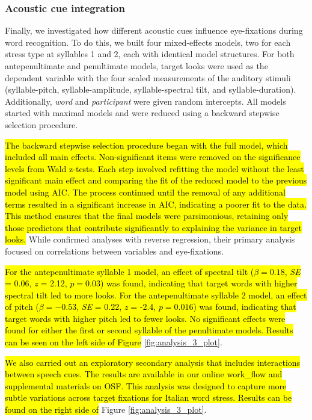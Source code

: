 \subsubsection{Acoustic cue integration}

Finally, we investigated how different acoustic cues influence eye-fixations during word recognition. To do this, we built four mixed-effects models, two for each stress type at syllables 1 and 2, each with identical model structures. For both antepenultimate and penultimate models, target looks were used as the dependent variable with the four scaled measurements of the auditory stimuli (syllable-pitch, syllable-amplitude, syllable-spectral tilt, and syllable-duration). Additionally, \textit{word} and \textit{participant} were given random intercepts. All models started with maximal models and were reduced using a backward stepwise selection procedure. 

\hl{The backward stepwise selection procedure began with the full model, which included all main effects. Non-significant items were removed on the significance levels from Wald z-tests. Each step involved refitting the model without the least significant main effect and comparing the fit of the reduced model to the previous model using AIC. The process continued until the removal of any additional terms resulted in a significant increase in AIC, indicating a poorer fit to the data. This method ensures that the final models were parsimonious, retaining only those predictors that contribute significantly to explaining the variance in target looks.} While \cite{Sulpizio_McQueen_2012} confirmed analyses with reverse regression, their primary analysis focused on correlations between variables and eye-fixations. 

\hl{For the antepenultimate syllable 1 model, an effect of spectral tilt ($\beta= 0.18$, \textit{SE} = 0.06, \textit{z} = 2.12, $p = 0.03$) was found, indicating that target words with higher spectral tilt led to more looks. For the antepenultimate syllable 2 model, an effect of pitch ($\beta= -0.53$, \textit{SE} = 0.22, \textit{z} = -2.4, $p = 0.016$) was found, indicating that target words with higher pitch led to fewer looks. No significant effects were found for either the first or second syllable of the penultimate models. Results can be seen on the left side of Figure }\ref{fig:analysis_3_plot}. 

\hl{We also carried out an exploratory secondary analysis that includes interactions between speech cues. The results are available in our online work\_flow and supplemental materials on OSF. This analysis was designed to capture more subtle variations across target fixations for Italian word stress. Results can be found on the right side of} Figure \ref{fig:analysis_3_plot}. 

